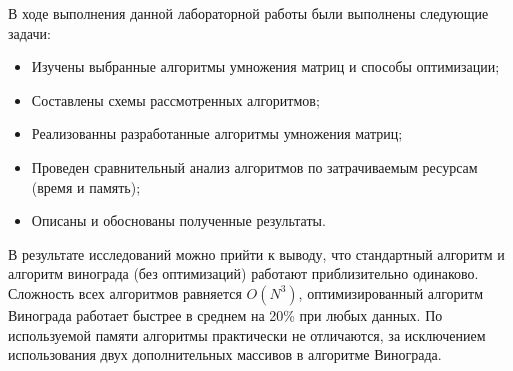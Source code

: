 
В ходе выполнения данной лабораторной работы были выполнены следующие задачи:
\begin{itemize}
	\item Изучены выбранные алгоритмы умножения матриц и способы оптимизации;
	\item Составлены схемы рассмотренных алгоритмов;
	\item Реализованны разработанные алгоритмы умножения матриц;
	\item Проведен сравнительный анализ алгоритмов по затрачиваемым ресурсам (время и память);
	\item Описаны и обоснованы полученные результаты.
\end{itemize}

В результате исследований можно прийти к выводу, что стандартный алгоритм и алгоритм винограда (без оптимизаций) работают приблизительно одинаково. Сложность всех алгоритмов равняется $O(N^3)$, оптимизированный алгоритм Винограда работает быстрее в среднем на 20\% при любых данных. По используемой памяти алгоритмы практически не отличаются, за исключением использования двух дополнительных массивов в алгоритме Винограда.